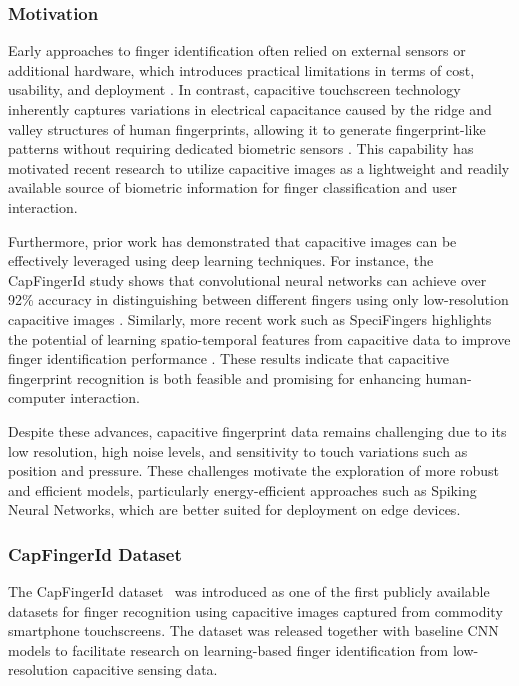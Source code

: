 \documentclass[../main.tex]{subfiles}
\begin{document}
\subsubsection{Motivation}
Early approaches to finger identification often relied on external sensors or additional hardware, which introduces practical limitations in terms of cost, usability, and deployment \cite{CapfingerId}. In contrast, capacitive touchscreen technology inherently captures variations in electrical capacitance caused by the ridge and valley structures of human fingerprints, allowing it to generate fingerprint-like patterns without requiring dedicated biometric sensors \cite{review_capacitive, A_Review_of_Fingerprint_Sensors}. This capability has motivated recent research to utilize capacitive images as a lightweight and readily available source of biometric information for finger classification and user interaction.

Furthermore, prior work has demonstrated that capacitive images can be effectively leveraged using deep learning techniques. For instance, the CapFingerId study shows that convolutional neural networks can achieve over 92\% accuracy in distinguishing between different fingers using only low-resolution capacitive images \cite{CapfingerId}. Similarly, more recent work such as SpeciFingers highlights the potential of learning spatio-temporal features from capacitive data to improve finger identification performance \cite{SpeciFingers}. These results indicate that capacitive fingerprint recognition is both feasible and promising for enhancing human-computer interaction.

Despite these advances, capacitive fingerprint data remains challenging due to its low resolution, high noise levels, and sensitivity to touch variations such as position and pressure. These challenges motivate the exploration of more robust and efficient models, particularly energy-efficient approaches such as Spiking Neural Networks, which are better suited for deployment on edge devices.

\subsubsection{CapFingerId Dataset}

The CapFingerId dataset~\cite{CapfingerId} was introduced as one of the first publicly available datasets for finger recognition using capacitive images captured from commodity smartphone touchscreens. The dataset was released together with baseline CNN models to facilitate research on learning-based finger identification from low-resolution capacitive sensing data.
\end{document}
